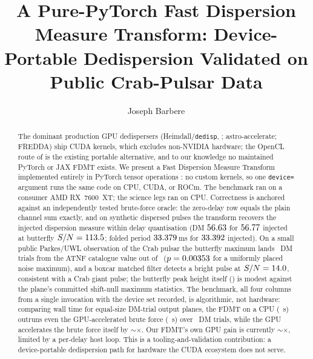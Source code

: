 \documentclass[twocolumn]{aastex631}
\newcommand{\code}[1]{\texttt{#1}}
\begin{document}
\title{A Pure-PyTorch Fast Dispersion Measure Transform: Device-Portable Dedispersion Validated on
Public Crab-Pulsar Data}

\author[0009-0008-3289-4447]{Joseph Barbere}

\begin{abstract}
The dominant production GPU dedispersers (Heimdall/\code{dedisp}, \citealt{barsdell2012};
astro-accelerate; FREDDA) ship CUDA kernels, which excludes non-NVIDIA hardware; the OpenCL
route of \citet{sclocco2016} is the existing portable alternative, and to our knowledge no
maintained PyTorch or JAX FDMT exists. We present a Fast Dispersion Measure Transform
\citep[FDMT;][]{zackayofek2017} implemented entirely in PyTorch tensor operations
\citep{pytorch}: no custom kernels, so one \code{device=} argument runs the same code on CPU,
CUDA, or ROCm. The benchmark ran on a consumer AMD RX~7600~XT; the science legs ran on CPU. Correctness is anchored against an independently tested brute-force
oracle: the zero-delay row equals the plain channel sum exactly, and on synthetic dispersed
pulses the transform recovers the injected dispersion measure within delay quantisation (DM
$56.63$ for $56.77$ injected at butterfly $S/N=113.5$; folded period $33.379$\,ms for
$33.392$ injected). On a small public Parkes/UWL observation of the Crab pulsar the butterfly
maximum lands \spRealOffTrials\ DM trials from the ATNF catalogue value \citep{manchester2005}
out of \spRealTrials\ ($p=0.00353$ for a uniformly placed noise maximum), and a boxcar
matched filter detects a bright pulse at $S/N=14.0$, consistent with a Crab giant
pulse; the butterfly peak height itself (\spRealSnr) is modest against the plane's committed
shift-null maximum statistics. The benchmark, all four columns from a single invocation with the device
set recorded, is algorithmic, not hardware: comparing wall time for equal-size DM-trial output
planes, the FDMT on a CPU (\spFdmtCpu~s) outruns even the GPU-accelerated brute force
(\spBruteGpu~s) over \spBenchNdm\ DM trials, while the GPU accelerates the brute force itself
by $\sim$\spBruteSpeedup$\times$. Our FDMT's own GPU gain is currently
$\sim$\spFdmtSpeedup$\times$, limited by a per-delay host loop. This is a tooling-and-validation
contribution: a device-portable dedispersion path for hardware the CUDA ecosystem does not
serve.
\end{abstract}

\end{document}
